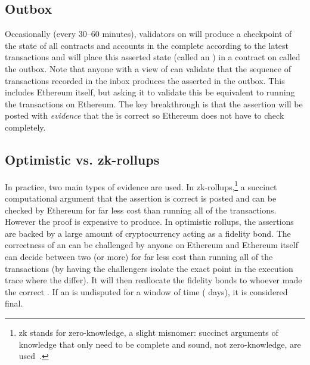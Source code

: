 \subsection{Outbox} Occasionally (\eg every 30--60 minutes), validators on \layertwo will produce a checkpoint of the state of all contracts and accounts in the complete \layertwo according to the latest transactions and will place this asserted state (called an \rblock) in a contract on \layerone called the outbox. Note that anyone with a view of \layerone can validate that the sequence of transactions recorded in the inbox produces the asserted \rblock in the outbox. This includes Ethereum itself, but asking it to validate this be equivalent to running the transactions on Ethereum. The key breakthrough is that the assertion will be posted with \textit{evidence} that the \rblock is correct so Ethereum does not have to check completely.

\subsection{Optimistic vs. zk-rollups} In practice, two main types of evidence are used. In zk-rollups,\footnote{zk stands for zero-knowledge, a slight misnomer: succinct arguments of knowledge that only need to be complete and sound, not zero-knowledge, are used~\cite{Mei21}.} a succinct computational argument that the assertion is correct is posted and can be checked by Ethereum for far less cost than running all of the transactions. However the proof is expensive to produce. In optimistic rollups, the assertions are backed by a large amount of cryptocurrency acting as a fidelity bond. The correctness of an \rblock can be challenged by anyone on Ethereum and Ethereum itself can decide between two (or more) \rblocks for far less cost than running all of the transactions (by having the challengers isolate the exact point in the execution trace where the \rblocks differ). It will then reallocate the fidelity bonds to whoever made the correct \rblock. If an \rblock is undisputed for a window of time ( days), it is considered final.

